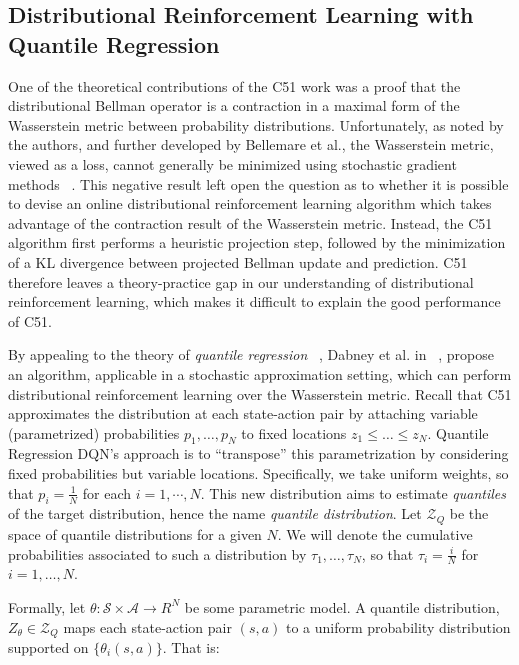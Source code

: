 \subsection{Distributional Reinforcement Learning with Quantile Regression}
One of the theoretical contributions of the C51 work was a proof that the distributional Bellman operator is a contraction in a maximal form of the Wasserstein metric between probability distributions. 
Unfortunately, as noted by the authors, and further developed by Bellemare et al., the Wasserstein metric, viewed as a loss, cannot generally be minimized using stochastic gradient methods ~\cite{DBLP:journals/corr/BellemareDM17}. This negative result left open the question as to whether it is possible to devise an online distributional reinforcement learning algorithm which takes advantage of the contraction result of the Wasserstein metric. Instead, the C51 algorithm first performs a heuristic projection step, followed by the minimization of a KL divergence between projected Bellman update and prediction. C51 therefore leaves a theory-practice gap in our understanding of distributional reinforcement learning, which makes it difficult to explain the good performance of C51.\par
By appealing to the theory of \emph{quantile regression} ~\cite{koenker2005quantile}, Dabney et al. in ~\cite{DBLP:journals/corr/abs-1710-10044}, propose an algorithm, applicable in a stochastic approximation setting, which can perform distributional reinforcement learning over the Wasserstein metric. Recall that C51 approximates the distribution at each state-action pair by attaching variable (parametrized) probabilities $p_1,\ldots,p_N$ to fixed locations $z_1 \leq \ldots \leq z_N$. Quantile Regression DQN's approach is to ``transpose'' this parametrization by considering fixed probabilities but variable locations. Specifically, we take uniform weights, so that $p_i= \frac{1}{N}$ for each $i = 1,\cdots,N$. This new distribution aims to estimate \emph{quantiles} of the target distribution, hence the name \emph{quantile distribution}. Let $\mathcal{Z}_Q$ be the space of quantile distributions for a given $N$. We will denote the cumulative probabilities associated to such a distribution by $\tau_1, \ldots, \tau_N$, so that $\tau_i=\frac{i}{N}$ for $i=1, \ldots, N$.\par
Formally, let $\theta: \mathcal{S} \times \mathcal{A} \rightarrow R^N$ be some parametric model. A quantile distribution, $Z_\theta \in \mathcal{Z}_Q$ maps each state-action pair $(s,a)$ to a uniform probability distribution supported on $\lbrace \theta_i(s,a) \rbrace$. That is:
